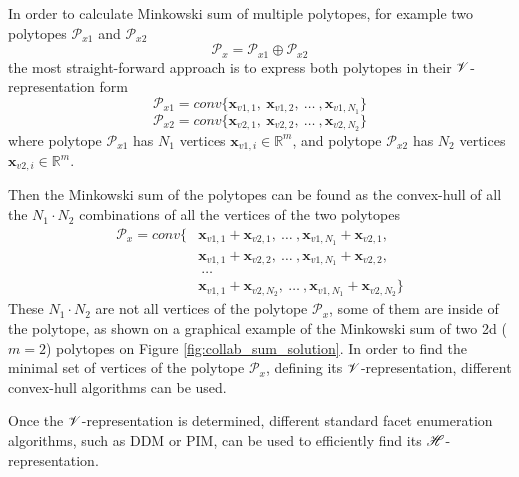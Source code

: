 In order to calculate Minkowski sum of multiple polytopes, for example two polytopes $\mathcal{P}_{x1}$ and $ \mathcal{P}_{x2}$
\begin{equation}
    \mathcal{P}_x = \mathcal{P}_{x1} \oplus \mathcal{P}_{x2}
\end{equation}
the most straight-forward approach is to express both polytopes in their $\mathscr{V}$-representation form
\begin{equation}
    \mathcal{P}_{x1} = conv\{
    \bm{x}_{v1,1},~\bm{x}_{v1,2},~\ldots~,\bm{x}_{v1,N_1}\}
\end{equation}
\begin{equation}
    \mathcal{P}_{x2} =  conv\{\bm{x}_{v2,1},~\bm{x}_{v2, 2},~\ldots~,\bm{x}_{v2,N_2}\}
\end{equation}
where polytope $\mathcal{P}_{x1}$ has $N_1$ vertices $\bm{x}_{v1,i}\in \mathbb{R}^m$, and polytope $\mathcal{P}_{x2}$ has $N_2$ vertices $\bm{x}_{v2,i}\in \mathbb{R}^m$.

Then the Minkowski sum of the polytopes can be found as the convex-hull of all the $N_1\!\cdot\!N_2$ combinations of all the vertices of the two polytopes
\begin{equation}
\begin{split}
    \mathcal{P}_x =  conv\big\{&\bm{x}_{v1,1} + \bm{x}_{v2,1},~ \ldots~,\bm{x}_{v1, N_1} + \bm{x}_{v2,1},\\&\bm{x}_{v1,1} + \bm{x}_{v2,2},~\ldots~,\bm{x}_{v1, N_1} + \bm{x}_{v2,2},\\&~\ldots~\\
    &\bm{x}_{v1, 1}  +\bm{x}_{v2,N_2}, ~\ldots~ ,\bm{x}_{v1, N_1} +\bm{x}_{v2,N_2}\big\}
\end{split}
\end{equation}
These $N_1\!\cdot\!N_2$ are not all vertices of the polytope $\mathcal{P}_x$, some of them are inside of the polytope, as shown on a graphical example of the Minkowski sum of two  2d ($m=2$) polytopes on Figure \ref{fig:collab_sum_solution}. In order to find the minimal set of vertices of the polytope $\mathcal
{P}_x$, defining its $\mathscr{V}$-representation, different convex-hull algorithms \cite{Barber1996} can be used.

Once the $\mathscr{V}$-representation is determined, different standard facet enumeration algorithms, such as DDM\cite{fukuda_dd} or PIM\cite{avis_pivoting_nodate}, can be used to efficiently find its $\mathscr{H}$-representation.


